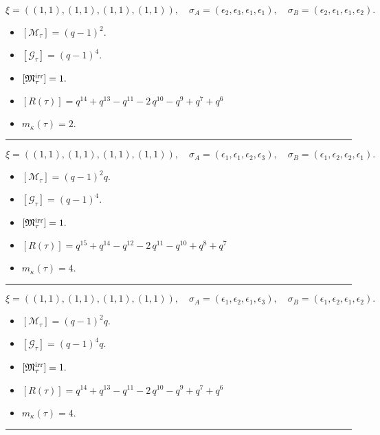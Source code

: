 \documentclass[10pt,a4paper]{amsart}
\begin{document}
$$\xi = ({(1, 1), (1, 1)}, {(1, 1), (1, 1)}),\quad \sigma_A = ({{\epsilon_2}, {\epsilon_3}}, {{\epsilon_1}, {\epsilon_1}}),\quad \sigma_B = ({{\epsilon_2}, {\epsilon_1}}, {{\epsilon_1}, {\epsilon_2}}).$$

\begin{itemize}
 \item $[\mathcal{M}_{\tau}] = {\left(q - 1\right)}^{2} .$

 \item $[\mathcal{G}_{\tau}] = {\left(q - 1\right)}^{4} .$

 \item $[{\frak M}_{\tau}^{\textrm{irr}}] = 1 .$

 \item $[R(\tau)] = q^{14} + q^{13} - q^{11} - 2 \, q^{10} - q^{9} + q^{7} + q^{6} $

 \item $m_{\kappa}(\tau) = 2 .$

 \end{itemize}
\noindent\rule{8cm}{0.4pt}

$$\xi = ({(1, 1), (1, 1)}, {(1, 1)}, {(1, 1)}),\quad \sigma_A = ({{\epsilon_1}, {\epsilon_1}}, {{\epsilon_2}}, {{\epsilon_3}}),\quad \sigma_B = ({{\epsilon_1}, {\epsilon_2}}, {{\epsilon_2}}, {{\epsilon_1}}).$$

\begin{itemize}
 \item $[\mathcal{M}_{\tau}] = {\left(q - 1\right)}^{2} q .$

 \item $[\mathcal{G}_{\tau}] = {\left(q - 1\right)}^{4} .$

 \item $[{\frak M}_{\tau}^{\textrm{irr}}] = 1 .$

 \item $[R(\tau)] = q^{15} + q^{14} - q^{12} - 2 \, q^{11} - q^{10} + q^{8} + q^{7} $

 \item $m_{\kappa}(\tau) = 4 .$

 \end{itemize}
\noindent\rule{8cm}{0.4pt}

$$\xi = ({(1, 1), (1, 1)}, {(1, 1)}, {(1, 1)}),\quad \sigma_A = ({{\epsilon_1}, {\epsilon_2}}, {{\epsilon_1}}, {{\epsilon_3}}),\quad \sigma_B = ({{\epsilon_1}, {\epsilon_2}}, {{\epsilon_1}}, {{\epsilon_2}}).$$

\begin{itemize}
 \item $[\mathcal{M}_{\tau}] = {\left(q - 1\right)}^{2} q .$

 \item $[\mathcal{G}_{\tau}] = {\left(q - 1\right)}^{4} q .$

 \item $[{\frak M}_{\tau}^{\textrm{irr}}] = 1 .$

 \item $[R(\tau)] = q^{14} + q^{13} - q^{11} - 2 \, q^{10} - q^{9} + q^{7} + q^{6} $

 \item $m_{\kappa}(\tau) = 4 .$

 \end{itemize}
\noindent\rule{8cm}{0.4pt}
\end{document}
